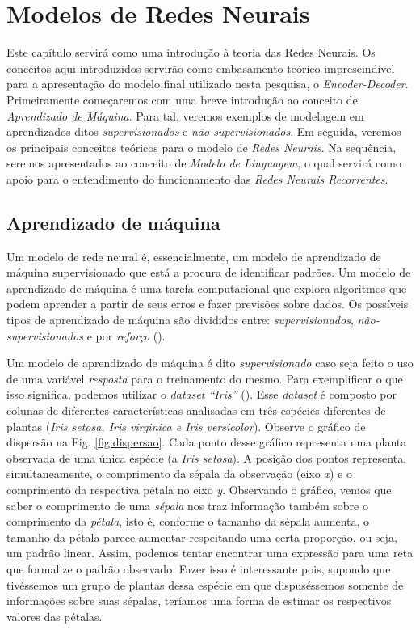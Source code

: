 \chapter{Modelos de Redes Neurais}
\label{ch:03}



Este capítulo servirá como uma introdução à teoria das Redes Neurais. Os conceitos aqui introduzidos servirão como embasamento teórico imprescindível para a apresentação do modelo final utilizado nesta pesquisa, o \textit{Encoder-Decoder}. Primeiramente começaremos com uma breve introdução ao conceito de \textit{Aprendizado de Máquina}. Para tal, veremos exemplos de modelagem em aprendizados ditos \textit{supervisionados} e \textit{não-supervisionados}. Em seguida, veremos os principais conceitos teóricos para o modelo de \textit{Redes Neurais}. Na sequência, seremos apresentados ao conceito de \textit{Modelo de Linguagem}, o qual servirá como apoio para o entendimento do funcionamento das \textit{Redes Neurais Recorrentes}.

\section{Aprendizado de máquina}
\label{sec:ml}

Um modelo de rede neural é, essencialmente, um modelo de aprendizado de máquina supervisionado
que está a procura de identificar padrões. Um modelo de aprendizado de máquina é uma tarefa computacional que explora algoritmos que podem aprender a partir de seus erros e fazer previsões sobre dados. Os possíveis tipos de aprendizado de máquina são divididos entre: \textit{supervisionados}, \textit{não-supervisionados}
e por \textit{reforço} (\cite{Gron:2017}). 

Um modelo de aprendizado de máquina é dito \textit{supervisionado} caso seja feito o uso de uma variável \textit{resposta} para o treinamento do mesmo. Para exemplificar o que isso significa, podemos utilizar o \textit{dataset “Iris”} (\cite{Dua:2019}). Esse \textit{dataset} é composto por colunas de diferentes características analisadas em três espécies diferentes de plantas (\textit{Iris setosa, Iris virginica e Iris versicolor}). Observe o gráfico de dispersão na Fig. \ref{fig:dispersao}. Cada ponto desse gráfico representa uma planta observada de uma única espécie (a \textit{Iris setosa}). A posição dos pontos representa, simultaneamente, o comprimento da sépala da observação (eixo \textit{x}) e o comprimento da respectiva pétala no eixo \textit{y}. Observando o gráfico, vemos que saber o comprimento de uma \textit{sépala} nos traz informação também sobre o comprimento da \textit{pétala}, isto é, conforme o tamanho da sépala aumenta, o tamanho da pétala parece aumentar respeitando uma certa proporção, ou seja, um padrão linear. Assim, podemos tentar encontrar uma expressão para uma reta que formalize o padrão observado. Fazer isso é interessante pois, supondo que tivéssemos um grupo de plantas dessa espécie em que dispuséssemos somente de informações sobre suas sépalas, teríamos uma forma de estimar os respectivos valores das pétalas.

